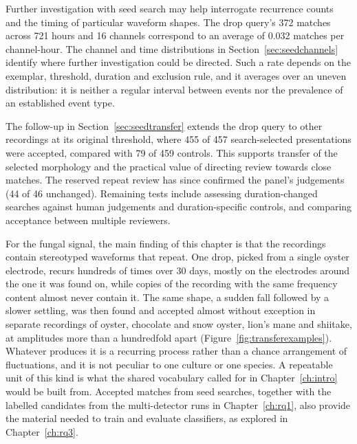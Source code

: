 Further investigation with seed search may help interrogate recurrence counts and the timing of particular waveform shapes. The drop query's 372 matches across 721 hours and 16 channels correspond to an average of 0.032 matches per channel-hour. The channel and time distributions in Section~\ref{sec:seedchannels} identify where further investigation could be directed. Such a rate depends on the exemplar, threshold, duration and exclusion rule, and it averages over an uneven distribution: it is neither a regular interval between events nor the prevalence of an established event type.

The follow-up in Section~\ref{sec:seedtransfer} extends the drop query to other recordings at its original threshold, where 455 of 457 search-selected presentations were accepted, compared with 79 of 459 controls. This supports transfer of the selected morphology and the practical value of directing review towards close matches. The reserved repeat review has since confirmed the panel's judgements (44 of 46 unchanged). Remaining tests include assessing duration-changed searches against human judgements and duration-specific controls, and comparing acceptance between multiple reviewers.

For the fungal signal, the main finding of this chapter is that the recordings contain stereotyped waveforms that repeat. One drop, picked from a single oyster electrode, recurs hundreds of times over 30 days, mostly on the electrodes around the one it was found on, while copies of the recording with the same frequency content almost never contain it. The same shape, a sudden fall followed by a slower settling, was then found and accepted almost without exception in separate recordings of oyster, chocolate and snow oyster, lion's mane and shiitake, at amplitudes more than a hundredfold apart (Figure~\ref{fig:transferexamples}). Whatever produces it is a recurring process rather than a chance arrangement of fluctuations, and it is not peculiar to one culture or one species. A repeatable unit of this kind is what the shared vocabulary called for in Chapter~\ref{ch:intro} would be built from. Accepted matches from seed searches, together with the labelled candidates from the multi-detector runs in Chapter~\ref{ch:rq1}, also provide the material needed to train and evaluate classifiers, as explored in Chapter~\ref{ch:rq3}.


